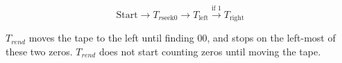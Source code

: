 $$\text{Start} \rightarrow T_{r\text{seek} 0} \rightarrow T_{\text{left}} \xrightarrow{\text{if 1}} T_{\text{right}}$$

$T_{rend}$ moves the tape to the left until finding $00$, and stops on the left-most of these two zeros. $T_{rend}$ does not start counting zeros until moving the tape.
